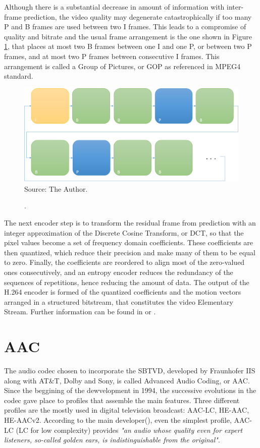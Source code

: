 \documentclass[
	12pt,				%
	openright,			%
	twoside,			%
	a4paper,			%
	brazil,
	french,				%
	english
	]{abntex2}
\begin{document}
Although there is a substantial decrease in amount of information with inter-frame prediction, the video quality may degenerate catastrophically if too many P and B frames are used between two I frames. This leads to a compromise of quality and bitrate and the usual frame arrangement is the one shown in Figure \ref{fig:IBBPBBP}, that places at most two B frames between one I and one P, or between two P frames, and at most two P frames between consecutive I frames. This arrangement is called a Group of Pictures, or GOP as referenced in MPEG4 standard.

\begin{figure}
\centering
\caption{.}
\includegraphics[width=1\linewidth]{figuras/IBBPBBP.png}
\\Source: The Author.
\label{fig:IBBPBBP}
\end{figure}

The next encoder step is to transform the residual frame from prediction with an integer approximation of the Discrete Cosine Transform, or DCT, so that the pixel values become a set of frequency domain coefficients. These coefficients are then quantized, which reduce their precision and make many of them to be equal to zero. Finally, the coefficients are reordered to align most of the zero-valued ones consecutively, and an entropy encoder reduces the redundancy of the sequences of repetitions, hence reducing the amount of data. The output of the H.264 encoder is formed of the quantized coefficients and the motion vectors arranged in a structured bitstream, that constitutes the video Elementary Stream. Further information can be found in \cite{vcodex} or \cite{richardson}.

\section{AAC}

The audio codec chosen to incorporate the SBTVD, developed by Fraunhofer IIS along with AT\&T, Dolby and Sony, is called Advanced Audio Coding, or AAC. Since the beggining of the dewvelopment in 1994, the successive evolutions in the codec gave place to profiles that assemble the main features. Three different profiles are the mostly used in digital television broadcast: AAC-LC, HE-AAC, HE-AACv2. According to the main developer(\cite{fraunhofer}), even the simplest profile, AAC-LC (LC for low complexity) provides \textit{"an audio whose quality even for expert listeners, so-called golden ears, is indistinguishable from the original"}.
\end{document}
